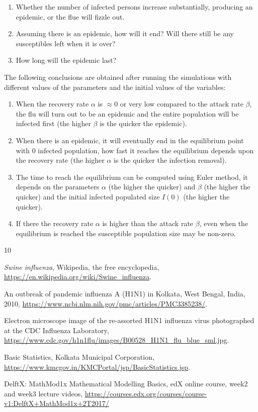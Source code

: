 \documentclass[11pt, a4paper, twoside]{report}
\begin{document}
\begin{enumerate}
\item Whether the number of infected persons increase substantially, producing an epidemic, or the flue will fizzle out. 
\item Assuming there is an epidemic, how will it end? Will there still be any susceptibles left when it is over? 
\item How long will the epidemic last?
\end{enumerate}

The following conclusions are obtained after running the simulations with different values of the parameters and the initial values of the variables:

\begin{enumerate}
\item When the recovery rate $\alpha$ is $\approx 0$ or very low compared to the attack rate $\beta$, the flu will turn out to be an epidemic and the entire population will be infected first (the higher $\beta$ is the quicker the epidemic). 
\item When there is an epidemic, it will eventually end in the equilibrium point with $0$ infected population, how fast it reaches the equilibrium depends upon the recovery rate (the higher $\alpha$ is the quicker the infection removal).
\item The time to reach the equilibrium can be computed using Euler method, it depends on the parameters $\alpha$ (the higher the quicker) and $\beta$ (the higher the quicker) and the initial infected populated size $I(0)$ (the higher the quicker).
\item If there the recovery rate $\alpha$ is higher than the attack rate  $\beta$, even when the equilibrium is reached the susceptible population size may be non-zero. 
\end{enumerate}

\begin{thebibliography}{10}  %

 \textit{Swine influenza}, 
Wikipedia, 
the free encyclopedia, 
\url{https://en.wikipedia.org/wiki/Swine_influenza}. 

 An outbreak of pandemic influenza A (H1N1) in Kolkata, 
West Bengal, 
India, 
2010,
\url{https://www.ncbi.nlm.nih.gov/pmc/articles/PMC3385238/}.

 Electron microscope image of the re-assorted H1N1 influenza virus photographed at the CDC Influenza Laboratory,
\url{https://www.cdc.gov/h1n1flu/images/B00528_H1N1_flu_blue_sml.jpg}.

 Basic Statistics, 
Kolkata Municipal Corporation,
\url{https://www.kmcgov.in/KMCPortal/jsp/BasicStatistics.jsp}.

 DelftX: MathMod1x Mathematical Modelling Basics,
edX online course,
week2 and week3 lecture videos, 
\url{https://courses.edx.org/courses/course-v1:DelftX+MathMod1x+2T2017/}

\end{thebibliography}  
\end{document}
